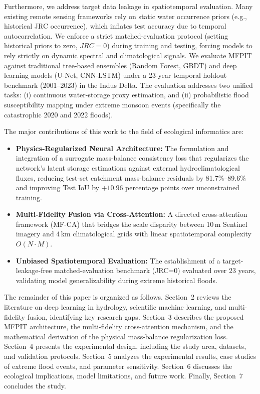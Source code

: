 \documentclass[preprint,12pt]{elsarticle}
\begin{document}
Furthermore, we address target data leakage in spatiotemporal evaluation. Many existing remote sensing frameworks rely on static water occurrence priors (e.g., historical JRC occurrence), which inflates test accuracy due to temporal autocorrelation. We enforce a strict matched-evaluation protocol (setting historical priors to zero, $JRC=0$) during training and testing, forcing models to rely strictly on dynamic spectral and climatological signals. We evaluate MFPIT against traditional tree-based ensembles (Random Forest, GBDT) and deep learning models (U-Net, CNN-LSTM) under a 23-year temporal holdout benchmark (2001--2023) in the Indus Delta. The evaluation addresses two unified tasks: (i) continuous water-storage proxy estimation, and (ii) probabilistic flood susceptibility mapping under extreme monsoon events (specifically the catastrophic 2020 and 2022 floods).

The major contributions of this work to the field of ecological informatics are:
\begin{itemize}
    \item \textbf{Physics-Regularized Neural Architecture:} The formulation and integration of a surrogate mass-balance consistency loss that regularizes the network's latent storage estimations against external hydroclimatological fluxes, reducing test-set catchment mass-balance residuals by 81.7\%--89.6\% and improving Test IoU by $+10.96$ percentage points over unconstrained training.
    \item \textbf{Multi-Fidelity Fusion via Cross-Attention:} A directed cross-attention framework (MF-CA) that bridges the scale disparity between 10\,m Sentinel imagery and 4\,km climatological grids with linear spatiotemporal complexity $O(N \cdot M)$.
    \item \textbf{Unbiased Spatiotemporal Evaluation:} The establishment of a target-leakage-free matched-evaluation benchmark (JRC=0) evaluated over 23 years, validating model generalizability during extreme historical floods.
\end{itemize}

The remainder of this paper is organized as follows. Section~2 reviews the literature on deep learning in hydrology, scientific machine learning, and multi-fidelity fusion, identifying key research gaps. Section~3 describes the proposed MFPIT architecture, the multi-fidelity cross-attention mechanism, and the mathematical derivation of the physical mass-balance regularization loss. Section~4 presents the experimental design, including the study area, datasets, and validation protocols. Section~5 analyzes the experimental results, case studies of extreme flood events, and parameter sensitivity. Section~6 discusses the ecological implications, model limitations, and future work. Finally, Section~7 concludes the study.
\end{document}
